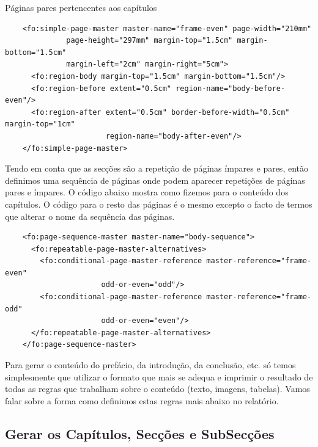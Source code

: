 \documentclass[a4paper]{article}
\begin{document}
Páginas pares pertencentes aos capítulos
\begin{small}
\begin{lstlisting}
    <fo:simple-page-master master-name="frame-even" page-width="210mm"
              page-height="297mm" margin-top="1.5cm" margin-bottom="1.5cm"
              margin-left="2cm" margin-right="5cm">
      <fo:region-body margin-top="1.5cm" margin-bottom="1.5cm"/>
      <fo:region-before extent="0.5cm" region-name="body-before-even"/>
      <fo:region-after extent="0.5cm" border-before-width="0.5cm" margin-top="1cm"
                       region-name="body-after-even"/>
    </fo:simple-page-master>
\end{lstlisting}
\end{small}

\hspace{1cm}Tendo em conta que as secções são a repetição de páginas ímpares e pares, então definimos uma sequência de páginas onde podem aparecer repetições de páginas pares e ímpares. O código abaixo mostra como fizemos para o conteúdo dos capítulos. O código para o resto das páginas é o mesmo excepto o facto de termos que alterar o nome da sequência das páginas.\\

\begin{small}
\begin{lstlisting}
    <fo:page-sequence-master master-name="body-sequence">
      <fo:repeatable-page-master-alternatives>
        <fo:conditional-page-master-reference master-reference="frame-even"
                      odd-or-even="odd"/>
        <fo:conditional-page-master-reference master-reference="frame-odd"
                      odd-or-even="even"/>
      </fo:repeatable-page-master-alternatives>
    </fo:page-sequence-master>    
\end{lstlisting}
\end{small}
    
\hspace{1cm}Para gerar o conteúdo do prefácio, da introdução, da conclusão, etc. só temos simplesmente que utilizar o formato que mais se adequa e imprimir o resultado de todas as regras que trabalham sobre o conteúdo (texto, imagens, tabelas). Vamos falar sobre a forma como definimos estas regras mais abaixo no relatório.\\


\subsection{\large Gerar os Capítulos, Secções e SubSecções}
\end{document}
